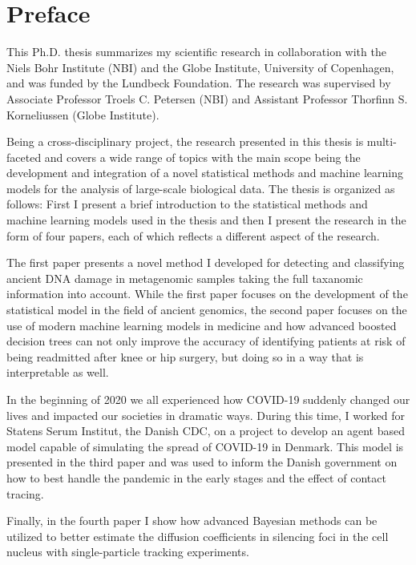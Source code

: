 \chapter{Preface}
This Ph.D. thesis summarizes my scientific research in collaboration with the Niels Bohr Institute (NBI) and the Globe Institute, University of Copenhagen, and was funded by the Lundbeck Foundation. The research was supervised by Associate Professor Troels C. Petersen (NBI) and Assistant Professor Thorfinn S. Korneliussen (Globe Institute).

Being a cross-disciplinary project, the research presented in this thesis is multi-faceted and covers a wide range of topics with the main scope being the development and integration of a novel statistical methods and machine learning models for the analysis of large-scale biological data. The thesis is organized as follows: First I present a brief introduction to the statistical methods and machine learning models used in the thesis and then I present the research in the form of four papers, each of which reflects a different aspect of the research.

The first paper presents a novel method I developed for detecting and classifying ancient DNA damage in metagenomic samples taking the full taxanomic information into account. While the first paper focuses on the development of the statistical model in the field of ancient genomics, the second paper focuses on the use of modern machine learning models in medicine and how advanced boosted decision trees can not only improve the accuracy of identifying patients at risk of being readmitted after knee or hip surgery, but doing so in a way that is interpretable as well.

In the beginning of 2020 we all experienced how COVID-19 suddenly changed our lives and impacted our societies in dramatic ways. During this time, I worked for Statens Serum Institut, the Danish CDC, on a project to develop an agent based model capable of simulating the spread of COVID-19 in Denmark. This model is presented in the third paper and was used to inform the Danish government on how to best handle the pandemic in the early stages and the effect of contact tracing.

Finally, in the fourth paper I show how advanced Bayesian methods can be utilized to better estimate the diffusion coefficients in silencing foci in the cell nucleus with single-particle tracking experiments.

